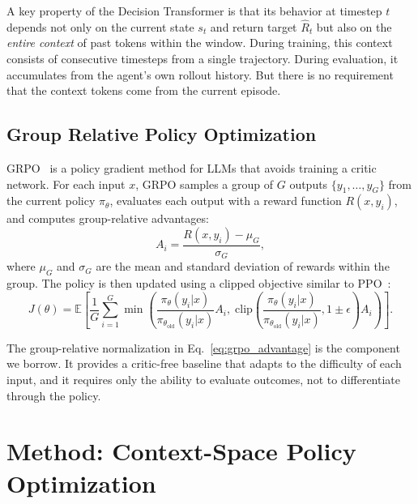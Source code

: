 \documentclass{article}
\newcommand{\EE}{\mathbb{E}}
\begin{document}
A key property of the Decision Transformer is that its behavior at timestep $t$ depends not only on the current state $s_t$ and return target $\hat{R}_t$ but also on the \emph{entire context} of past tokens within the window. During training, this context consists of consecutive timesteps from a single trajectory. During evaluation, it accumulates from the agent's own rollout history. But there is no requirement that the context tokens come from the current episode.

\subsection{Group Relative Policy Optimization}
\label{sec:prelim_grpo}

GRPO~\citep{shao2024deepseekmath} is a policy gradient method for LLMs that avoids training a critic network. For each input $x$, GRPO samples a group of $G$ outputs $\{y_1, \ldots, y_G\}$ from the current policy $\pi_\theta$, evaluates each output with a reward function $R(x, y_i)$, and computes group-relative advantages:
\begin{equation}
    \label{eq:grpo_advantage}
    A_i = \frac{R(x, y_i) - \mu_G}{\sigma_G},
\end{equation}
where $\mu_G$ and $\sigma_G$ are the mean and standard deviation of rewards within the group. The policy is then updated using a clipped objective similar to PPO~\citep{schulman2017proximal}:
\begin{equation}
    \label{eq:grpo_objective}
    J(\theta) = \EE \left[ \frac{1}{G} \sum_{i=1}^{G} \min\left( \frac{\pi_\theta(y_i|x)}{\pi_{\theta_{\text{old}}}(y_i|x)} A_i, \; \text{clip}\left(\frac{\pi_\theta(y_i|x)}{\pi_{\theta_{\text{old}}}(y_i|x)}, 1\pm\epsilon\right) A_i \right) \right].
\end{equation}

The group-relative normalization in Eq.~\eqref{eq:grpo_advantage} is the component we borrow. It provides a critic-free baseline that adapts to the difficulty of each input, and it requires only the ability to evaluate outcomes, not to differentiate through the policy.


\section{Method: Context-Space Policy Optimization}
\label{sec:method}
\end{document}
